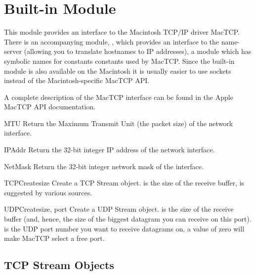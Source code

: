 \section{Built-in Module }
\label{module-mactcp}


This module provides an interface to the Macintosh TCP/IP driver%
 MacTCP\@. There is an accompanying module,
, which provides an interface to
the name-server (allowing you to translate hostnames to IP addresses),
a module  which has
symbolic names for constants constants used by MacTCP. Since the
built-in module  is also available on the Macintosh it
is usually easier to use sockets instead of the Macintosh-specific
MacTCP API.

A complete description of the MacTCP interface can be found in the
Apple MacTCP API documentation.

\begin{funcdesc}{MTU}{}
Return the Maximum Transmit Unit (the packet size) of the network
interface.
\end{funcdesc}

\begin{funcdesc}{IPAddr}{}
Return the 32-bit integer IP address of the network interface.
\end{funcdesc}

\begin{funcdesc}{NetMask}{}
Return the 32-bit integer network mask of the interface.
\end{funcdesc}

\begin{funcdesc}{TCPCreate}{size}
Create a TCP Stream object.  is the size of the receive
buffer,  is suggested by various sources.
\end{funcdesc}

\begin{funcdesc}{UDPCreate}{size, port}
Create a UDP Stream object.  is the size of the receive
buffer (and, hence, the size of the biggest datagram you can receive
on this port).  is the UDP port number you want to receive
datagrams on, a value of zero will make MacTCP select a free port.
\end{funcdesc}


\subsection{TCP Stream Objects}

